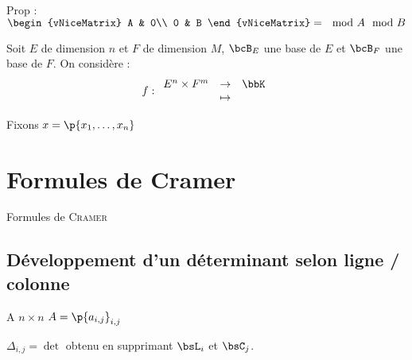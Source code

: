 \documentclass[a4paper,french,bookmarks]{book}
\begin{document}
    Prop : $\begin{vNiceMatrix}
        A & 0\\
        0 & B
    \end{vNiceMatrix} = \mod{A}\mod{B}$
    
    Soit $E$ de dimension $n$ et $F$ de dimension $M$, $\bcB_E$ une base de $E$ et $\bcB_F$ une base de $F$. On considère :
    \[ f : \begin{array}{rcl}
        E^n \times F^m &\to& \bbK  \\
         &\mapsto &
    \end{array}\]
    
    Fixons $x = \p{x_1, \dots, x_n}$
    
    \section{Formules de Cramer}
    
    Formules de \textsc{Cramer}
    
    \subsection{Développement d'un déterminant selon ligne / colonne}
    
    A \quad $n \times n$ \quad $A = \p{a_{i, j}}_{i, j}$
    
    $\Delta_{i, j} = \det$ obtenu en supprimant $\bsL_i$ et $\bsC_j$.
    
\end{document}
